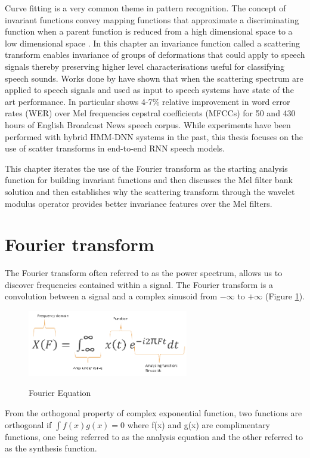 Curve fitting is a very common theme in pattern recognition. The concept of invariant functions convey mapping functions that approximate a discriminating function when a parent function is reduced from a high dimensional space to a low dimensional space \cite{mallat2016understanding}.  In this chapter an invariance function called a scattering transform  enables invariance of groups of deformations that could apply to speech signals thereby preserving higher level characterisations useful for classifying speech sounds. Works done by \citep{peddinti2014deep,zeghidour2016deep,anden2011multiscale,sainath2014deep} have shown that when the scattering spectrum are applied to speech signals and used as input to speech systems have state of the art performance.  In particular \cite{sainath2014deep} shows 4-7\% relative improvement in word error rates (WER) over Mel frequencies cepstral coefficients (MFCCs) for 50 and 430 hours of English Broadcast News speech corpus.  While experiments have been performed with hybrid HMM-DNN systems in the past, this thesis focuses on the use of scatter transforms in end-to-end RNN speech models.

This chapter iterates the use of the Fourier transform as the starting analysis function for building invariant functions and then discusses the Mel filter bank solution and then establishes why the scattering transform through the wavelet modulus operator provides better invariance features over the Mel filters.

\section{Fourier transform}
The Fourier transform often referred to as the power spectrum, allows us to discover frequencies contained within a signal.  The Fourier transform is a convolution between a signal and a complex sinusoid from $-\infty$ to $+\infty$ (Figure \ref{fig_4_1_fourier_eqn}). 

\begin{figure}
\centering
  \includegraphics[width=7cm]{thesis/images/fourier.png}\\
  \caption{Fourier Equation} \label{fig_4_1_fourier_eqn}
\end{figure}
From the orthogonal property of complex exponential function, two functions are orthogonal if $\int f(x)g(x)=0$ where f(x) and g(x) are complimentary functions, one being referred to as the analysis equation and the other referred to as the synthesis function.


